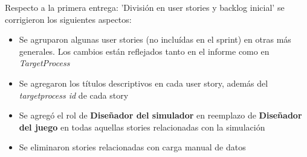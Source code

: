 Respecto a la primera entrega: 'División en user stories y backlog inicial' se corrigieron los siguientes aspectos:

\begin{itemize}
  \item Se agruparon algunas user stories (no incluídas en el sprint) en otras más generales. Los cambios están reflejados tanto en el informe como en \emph{TargetProcess}
  \item Se agregaron los títulos descriptivos en cada user story, además del \emph{targetprocess id} de cada story
  \item Se agregó el rol de \textbf{Diseñador del simulador} en reemplazo de \textbf{Diseñador del juego} en todas aquellas stories relacionadas con la simulación
  \item Se eliminaron stories relacionadas con carga manual de datos
\end{itemize}
